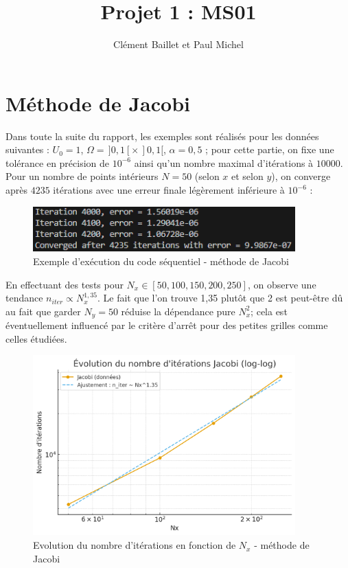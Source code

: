 \documentclass{article}
\title{Projet 1 : MS01}
\author{Clément Baillet et Paul Michel}
\date{}
\begin{document}
\maketitle


\section{Méthode de Jacobi}


Dans toute la suite du rapport, les exemples sont réalisés pour les données suivantes : $U_0 = 1$, $\Omega = \,]0, 1[ \times \,]0, 1[$, $\alpha = 0,5$ ; pour cette partie, on fixe une tolérance en précision de $10^{-6}$ ainsi qu'un nombre maximal d'itérations à $10 000$. Pour un nombre de points intérieurs $N = 50$ (selon $x$ et selon $y$), on converge après $4235$ itérations avec une erreur finale légèrement inférieure à $10^{-6}$ :

\begin{figure}[H]
    \centering
    \includegraphics[width=0.9\textwidth]{test_jacobi_seq.png}
    \caption{Exemple d'exécution du code séquentiel - méthode de Jacobi}
    \label{fig:Jacseq}
\end{figure}

En effectuant des tests  pour $N_x \in [50,100,150,200,250]$, on observe une tendance $n_{iter} \propto N_x^{1,35}$. Le fait que l'on trouve 1,35 plutôt que 2 est peut-être dû au fait que garder $N_y=50$ réduise la dépendance pure $N_x^2$; cela est éventuellement influencé par le critère d'arrêt pour des petites grilles comme celles étudiées.

\begin{figure}[H]
    \centering
    \includegraphics[width=0.9\textwidth]{courbe_log_log_jacobi.png}
    \caption{Evolution du nombre d'itérations en fonction de $N_x$ - méthode de Jacobi}
    \label{fig:loglogJac}
\end{figure}
\end{document}

